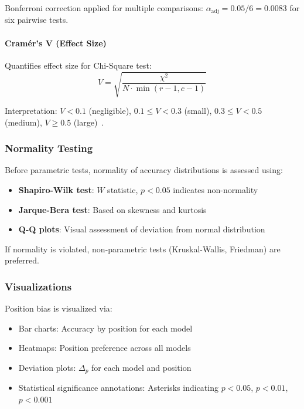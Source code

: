 Bonferroni correction applied for multiple comparisons: $\alpha_{\text{adj}} = 0.05 / 6 = 0.0083$ for six pairwise tests.

\paragraph{Cramér's V (Effect Size)}
Quantifies effect size for Chi-Square test:
\begin{equation}
V = \sqrt{\frac{\chi^2}{N \cdot \min(r-1, c-1)}}
\end{equation}

Interpretation: $V < 0.1$ (negligible), $0.1 \leq V < 0.3$ (small), $0.3 \leq V < 0.5$ (medium), $V \geq 0.5$ (large)~\citep{cohen1988}.

\subsubsection{Normality Testing}

Before parametric tests, normality of accuracy distributions is assessed using:
\begin{itemize}
    \item \textbf{Shapiro-Wilk test}: $W$ statistic, $p < 0.05$ indicates non-normality
    \item \textbf{Jarque-Bera test}: Based on skewness and kurtosis
    \item \textbf{Q-Q plots}: Visual assessment of deviation from normal distribution
\end{itemize}

If normality is violated, non-parametric tests (Kruskal-Wallis, Friedman) are preferred.

\subsubsection{Visualizations}

Position bias is visualized via:
\begin{itemize}
    \item Bar charts: Accuracy by position for each model
    \item Heatmaps: Position preference across all models
    \item Deviation plots: $\Delta_p$ for each model and position
    \item Statistical significance annotations: Asterisks indicating $p < 0.05$, $p < 0.01$, $p < 0.001$
\end{itemize}

